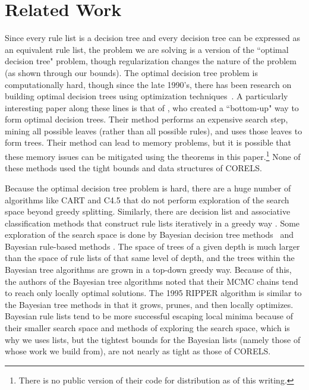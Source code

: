 \section{Related Work}

Since every rule list is a decision tree and every decision tree can be expressed as an equivalent rule list, the problem we are solving is a version of the ``optimal decision tree" problem, though regularization changes the nature of the problem (as shown through our bounds). The optimal decision tree problem is computationally hard, though since the late 1990's, there has been research on building optimal decision trees using optimization techniques~\citep{Bennett96optimaldecision,dobkininduction,FarhangfarGZ08}. A particularly interesting paper along these lines is that of \citet{NijssenFromont2010}, who created a ``bottom-up" way to form optimal decision trees. Their method performs an expensive search step, mining all possible leaves (rather than all possible rules), and uses those leaves to form trees. Their method can lead to memory problems, but it is possible that these memory issues can be mitigated using the theorems in this paper.\footnote{There is no public version of their code for distribution as of this writing.} None of these methods used the tight bounds and data structures of CORELS.

Because the optimal decision tree problem is hard, there are a huge number of algorithms like CART \citep{Breiman84} and C4.5 \citep{Quinlan93} that do not perform exploration of the search space beyond greedy splitting. Similarly, there are decision list and associative classification methods that construct rule lists iteratively in a greedy way
\citep{Rivest87,Liu98,Li01,Yin03,Sokolova03,Marchand05,Vanhoof10,RudinLeMa13}.
Some exploration of the search space is done by Bayesian decision tree methods~\citep{Dension:1998hl,Chipman:2002hc,Chipman10} and Bayesian rule-based methods \citep{LethamRuMcMa15,YangRuSe16}. The space of trees of a given depth is much larger than the space of
rule lists of that same level of depth, and the trees within the Bayesian tree algorithms
are grown in a top-down greedy way. Because of this, the authors of the Bayesian tree algorithms noted that their MCMC chains tend to reach only locally optimal solutions. 
The 1995 RIPPER algorithm \citep{ripper} is similar to the Bayesian tree methods in that it grows, prunes, and then locally optimizes.
Bayesian rule lists tend to be more successful escaping local minima because of their smaller search space and methods of exploring the search space, which is why we uses lists, but the tightest bounds for the Bayesian lists (namely those of \citet{YangRuSe16} whose work we build from), are not nearly as tight as those of CORELS.


